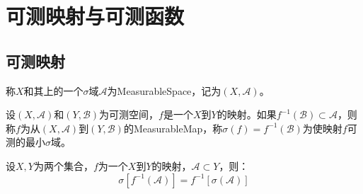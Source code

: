 \section{可测映射与可测函数}
\subsection{可测映射}
\begin{definition}
	称$X$和其上的一个$\sigma$域$\mathscr{A}$为\gls{MeasurableSpace}，记为$(X,\mathscr{A})$。
\end{definition}
\begin{definition}
	设$(X,\mathscr{A})$和$(Y,\mathscr{B})$为可测空间，$f$是一个$X$到$Y$的映射。如果$f^{-1}(\mathscr{B})\subset\mathscr{A}$，则称$f$为从$(X,\mathscr{A})$到$(Y,\mathscr{B})$的\gls{MeasurableMap}，称$\sigma(f)=f^{-1}(\mathscr{B})$为使映射$f$可测的最小$\sigma$域。
\end{definition}
\begin{lemma}
	设$X,Y$为两个集合，$f$为一个$X$到$Y$的映射，$\mathscr{A}\subset Y$，则：
	\begin{equation*}
		\sigma[f^{-1}(\mathscr{A})]=f^{-1}[\sigma(\mathscr{A})]
	\end{equation*}
\end{lemma}
